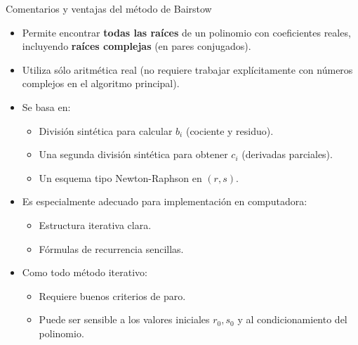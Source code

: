 \documentclass[../../main.tex]{subfiles}
\begin{document}
\begin{frame}{Comentarios y ventajas del método de Bairstow}
  \begin{itemize}
    \item Permite encontrar \textbf{todas las raíces} de un polinomio con coeficientes reales,
          incluyendo \textbf{raíces complejas} (en pares conjugados).
    \item Utiliza sólo aritmética real (no requiere trabajar explícitamente
          con números complejos en el algoritmo principal).
    \item Se basa en:
      \begin{itemize}
        \item División sintética para calcular \(b_i\) (cociente y residuo).
        \item Una segunda división sintética para obtener \(c_i\) (derivadas parciales).
        \item Un esquema tipo Newton-Raphson en \((r,s)\).
      \end{itemize}
    \item Es especialmente adecuado para implementación en computadora:
      \begin{itemize}
        \item Estructura iterativa clara.
        \item Fórmulas de recurrencia sencillas.
      \end{itemize}
    \item Como todo método iterativo:
      \begin{itemize}
        \item Requiere buenos criterios de paro.
        \item Puede ser sensible a los valores iniciales \(r_0, s_0\) y al condicionamiento
              del polinomio.
      \end{itemize}
  \end{itemize}
\end{frame}
\end{document}
